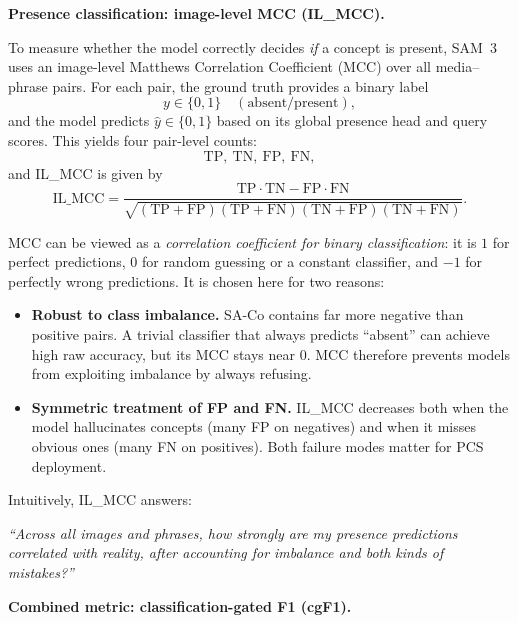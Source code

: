 \begin{enrichment}
\begin{enrichment}
		\medskip
		\noindent\textbf{Presence classification: image-level MCC (IL\_MCC).}
		
		To measure whether the model correctly decides \emph{if} a concept is present, SAM~3 uses an image-level Matthews Correlation Coefficient (MCC) over all media--phrase pairs. For each pair, the ground truth provides a binary label
		\[
		y \in \{0,1\} \quad (\text{absent/present}),
		\]
		and the model predicts $\hat{y} \in \{0,1\}$ based on its global presence head and query scores. This yields four pair-level counts:
		\[
		\mathrm{TP},\ \mathrm{TN},\ \mathrm{FP},\ \mathrm{FN},
		\]
		and IL\_MCC is given by
		\[
		\mathrm{IL\_MCC} =
		\frac{\mathrm{TP} \cdot \mathrm{TN} - \mathrm{FP} \cdot \mathrm{FN}}
		{\sqrt{(\mathrm{TP}+\mathrm{FP})(\mathrm{TP}+\mathrm{FN})(\mathrm{TN}+\mathrm{FP})(\mathrm{TN}+\mathrm{FN})}}.
		\]
		
		MCC can be viewed as a \emph{correlation coefficient for binary classification}: it is $1$ for perfect predictions, $0$ for random guessing or a constant classifier, and $-1$ for perfectly wrong predictions. It is chosen here for two reasons:
		\begin{itemize}
			\item \textbf{Robust to class imbalance.} SA-Co contains far more negative than positive pairs. A trivial classifier that always predicts ``absent'' can achieve high raw accuracy, but its MCC stays near $0$. MCC therefore prevents models from exploiting imbalance by always refusing.
			\item \textbf{Symmetric treatment of FP and FN.} IL\_MCC decreases both when the model hallucinates concepts (many FP on negatives) and when it misses obvious ones (many FN on positives). Both failure modes matter for PCS deployment.
		\end{itemize}
		
		Intuitively, IL\_MCC answers:
		\begin{center}
			\emph{``Across all images and phrases, how strongly are my presence predictions correlated with reality, after accounting for imbalance and both kinds of mistakes?''}
		\end{center}
		
		\medskip
		\noindent\textbf{Combined metric: classification-gated F1 (cgF1).}
		

\end{enrichment}
\end{enrichment}
